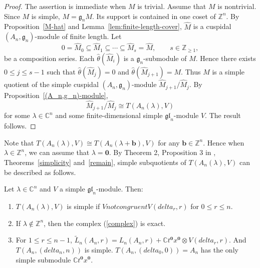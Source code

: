 \documentclass[12pt,a4paper]{amsart}
\def\mg{g}%
\def\gl{gl}%
\def\delta{delta}%
\def\ncong{not congruent}%
\numberwithin{equation}{section}
\newcommand{\C}{\mathbb C}
\newcommand{\Z}{\mathbb{Z}}
\def\mg{\mathfrak{g}}
\def\gl{\mathfrak{gl}}
\def\bb{\mathbf{b}}
\def\bo{\mathbf{0}}
\begin{document}
\begin{proof}
The assertion is immediate when \(M\) is trivial. Assume that \(M\) is
nontrivial. Since \(M\) is simple, \(M=\mg_nM\). Its support is
contained in one coset of \(\Z^n\). By Proposition~\ref{M-hat} and
Lemma~\ref{lem:finite-length-cover}, \(\widehat M\) is a cuspidal
\((A_n,\mg_n)\)-module of finite length. Let
\[
0=\widehat M_0\subseteq\widehat M_1\subseteq\cdots
\subseteq\widehat M_s=\widehat M,\qquad s\in\Z_{\geq1},
\]
be a composition series. Each \(\hat\theta(\widehat M_i)\) is a
\(\mg_n\)-submodule of \(M\). Hence there exists
\(0\leq j\leq s-1\) such that
\(\hat\theta(\widehat M_j)=0\) and
\(\hat\theta(\widehat M_{j+1})=M\). Thus \(M\) is a simple quotient of
the simple cuspidal \((A_n,\mg_n)\)-module
\(\widehat M_{j+1}/\widehat M_j\). By
Proposition~\ref{(A_n,g_n)-module},
\[
\widehat M_{j+1}/\widehat M_j\cong T(A_n(\lambda),V)
\]
for some \(\lambda\in\C^n\) and some finite-dimensional simple
\(\gl_n\)-module \(V\). The result follows.
\end{proof}



Note that  $T(A_n(\lambda),V)\cong T(A_n(\lambda+\bb),V)$ for any $\bb\in \Z^n$. Hence when $\lambda\in \Z^n$, we can assume that $\lambda=\bo$. By Theorem 2, Proposition 3 in \cite{Z}, Theorems~\ref{simplicity}
and~\ref{remain}, simple subquotients of $T(A_n(\lambda),V)$ can be described as follows.


Let $\lambda\in \C^n$ and \(V\) a simple
\(\gl_n\)-module. Then:
\begin{enumerate}
\item \(T(A_n(\lambda),V)\) is simple if
\(V\ncong V(\delta_r,r)\) for \(0\leq r\leq n\).

\item If $\lambda\not\in \Z^n$, then the complex (\ref{complex}) is exact.
\item For $1\leq r\leq n-1$, $\tilde{L}_n(A_n,r)=L_n(A_n,r)+\C t^{\bo}x^{\bo}\otimes V(\delta_r,r)$. And $T(A_n,(\delta_n,n))$ is simple.  $T(A_n,(\delta_0,0))=A_n$ has the only simple submodule $\C t^{\bo}x^{\bo}$.
\end{enumerate}


\vspace{2mm}

\noindent
\end{document}
